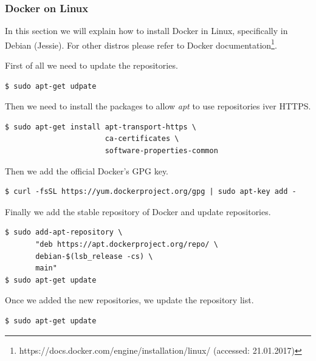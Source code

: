 \subsubsection{Docker on Linux}
In this section we will explain how to install Docker in Linux, specifically in Debian (Jessie). For other distros please refer to Docker documentation\footnote{https://docs.docker.com/engine/installation/linux/ (accessed: 21.01.2017)}.

First of all we need to update the repositories.

\begin{verbatim}
$ sudo apt-get udpate
\end{verbatim}

Then we need to install the packages to allow \textit{apt} to use repositories iver HTTPS.

\begin{verbatim}
$ sudo apt-get install apt-transport-https \
                       ca-certificates \
                       software-properties-common
\end{verbatim}

Then we add the official Docker's GPG key.

\begin{verbatim}
$ curl -fsSL https://yum.dockerproject.org/gpg | sudo apt-key add -
\end{verbatim}

Finally we add the stable repository of Docker and update repositories.

\begin{verbatim}
$ sudo add-apt-repository \
       "deb https://apt.dockerproject.org/repo/ \
       debian-$(lsb_release -cs) \
       main"
$ sudo apt-get update
\end{verbatim}

Once we added the new repositories, we update the repository list.

\begin{verbatim}
$ sudo apt-get update
\end{verbatim}

